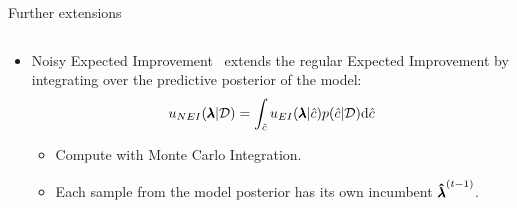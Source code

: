 \begin{frame}[c]{Further extensions}
\begin{columns}[T]
\end{columns}
\begin{itemize}
    \item Noisy Expected Improvement~ extends the regular Expected Improvement by integrating over the predictive posterior of the model:
    \begin{equation*}
        \acq_{NEI}(\conf|\dataset)=\int_{\surro}\acq_{EI}(\conf|\surro)p(\surro|\dataset)\text{d}\surro
    \end{equation*}
    \vspace{-0.2cm}
    \begin{itemize}
        \item Compute with Monte Carlo Integration.
        \item Each sample from the model posterior has its own incumbent $\incumbent[\bocount-1]$.
    \end{itemize}
    \end{itemize}
\end{frame}


